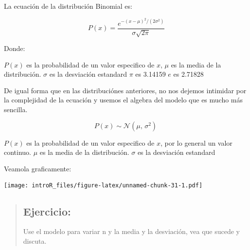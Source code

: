 \documentclass[
]{book}
\newenvironment{Shaded}{\begin{snugshade}}{\end{snugshade}}
\newcommand{\CommentTok}[1]{\textcolor[rgb]{0.56,0.35,0.01}{\textit{#1}}}
\newcommand{\DataTypeTok}[1]{\textcolor[rgb]{0.13,0.29,0.53}{#1}}
\newcommand{\DecValTok}[1]{\textcolor[rgb]{0.00,0.00,0.81}{#1}}
\newcommand{\FloatTok}[1]{\textcolor[rgb]{0.00,0.00,0.81}{#1}}
\newcommand{\KeywordTok}[1]{\textcolor[rgb]{0.13,0.29,0.53}{\textbf{#1}}}
\newcommand{\NormalTok}[1]{#1}
\newcommand{\OperatorTok}[1]{\textcolor[rgb]{0.81,0.36,0.00}{\textbf{#1}}}
\newcommand{\StringTok}[1]{\textcolor[rgb]{0.31,0.60,0.02}{#1}}
\begin{document}
La ecuación de la distribución Binomial es:

\begin{equation} 
P\left(x \right) =  \frac{e^{-(x - \mu)^{2}/(2\sigma^{2}) }} {\sigma\sqrt{2\pi}}
\label{eq:norm}
\end{equation}

Donde:

\(P(x)\) es la probabilidad de un valor especifico de \(x\),
\(\mu\) es la media de la distribución.
\(\sigma\) es la desviación estandard
\(\pi\) es 3.14159
\(e\) es 2.71828

De igual forma que en las distribuciónes anteriores, no nos dejemos intimidar por la complejidad de la ecuación y usemos el algebra del modelo que es mucho más sencilla.

\begin{equation} 
  P\left( x \right) \sim \mathcal{N}(\mu,\,\sigma^{2})\
  \label{eq:binom}
\end{equation}

\(P(x)\) es la probabilidad de un valor especifico de \(x\), por lo general un valor continuo.
\(\mu\) es la media de la distribución.
\(\sigma\) es la desviación estandard

Veamola graficamente:

\begin{Shaded}
\end{Shaded}

\texttt{[image: introR\_files/figure-latex/unnamed-chunk-31-1.pdf]}

\begin{quote}
\hypertarget{ejercicio-8}{%
\subsection{Ejercicio:}\label{ejercicio-8}}

Use el modelo para variar n y la media y la desviación, vea que sucede y discuta.
\end{quote}

  
\end{document}
